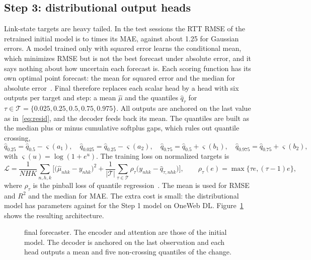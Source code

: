 \subsection{Step 3: distributional output heads}
Link-state targets are heavy tailed. In the test sessions the RTT RMSE of the retrained initial model is \RatioRMSEMAEMin{} to \RatioRMSEMAEMax{} times its MAE, against about 1.25 for Gaussian errors. A model trained only with squared error learns the conditional mean, which minimizes RMSE but is not the best forecast under absolute error, and it says nothing about how uncertain each forecast is. Each scoring function has its own optimal point forecast: the mean for squared error and the median for absolute error~\cite{gneiting2011making}. Final therefore replaces each scalar head by a head with six outputs per target and step: a mean $\hat{\mu}$ and the quantiles $\hat{q}_\tau$ for $\tau\in\mathcal{T}=\{0.025, 0.25, 0.5, 0.75, 0.975\}$. All outputs are anchored on the last value as in~\eqref{eq:resid}, and the decoder feeds back its mean. The quantiles are built as the median plus or minus cumulative softplus gaps, which rules out quantile crossing,
\begin{equation}
\hat{q}_{0.25}=\hat{q}_{0.5}-\varsigma(a_1),\quad \hat{q}_{0.025}=\hat{q}_{0.25}-\varsigma(a_2),\quad
\hat{q}_{0.75}=\hat{q}_{0.5}+\varsigma(b_1),\quad \hat{q}_{0.975}=\hat{q}_{0.75}+\varsigma(b_2),
\end{equation}
with $\varsigma(u)=\log(1+e^u)$. The training loss on normalized targets is
\begin{equation}
\mathcal{L} = \frac{1}{NHK}\sum_{n,h,k}\Big[\big(\hat{\mu}_{nhk}-y_{nhk}\big)^2 + \frac{1}{|\mathcal{T}|}\sum_{\tau\in\mathcal{T}}\rho_\tau\big(y_{nhk}-\hat{q}_{\tau,nhk}\big)\Big],
\qquad \rho_\tau(e)=\max\{\tau e,(\tau-1)e\},
\label{eq:loss}
\end{equation}
where $\rho_\tau$ is the pinball loss of quantile regression~\cite{koenker1978regression}. The mean is used for RMSE and $R^2$ and the median for MAE. The extra cost is small: the distributional model has \ParamsDist{} parameters against \ParamsResid{} for the Step 1 model on OneWeb DL. Figure~\ref{fig:arch} shows the resulting architecture.

\begin{figure}[t]
  \centering
  \resizebox{0.86\linewidth}{!}{}
  \caption{final forecaster. The encoder and attention are those of the initial model. The decoder is anchored on the last observation and each head outputs a mean and five non-crossing quantiles of the change.}
  \label{fig:arch}
\end{figure}

